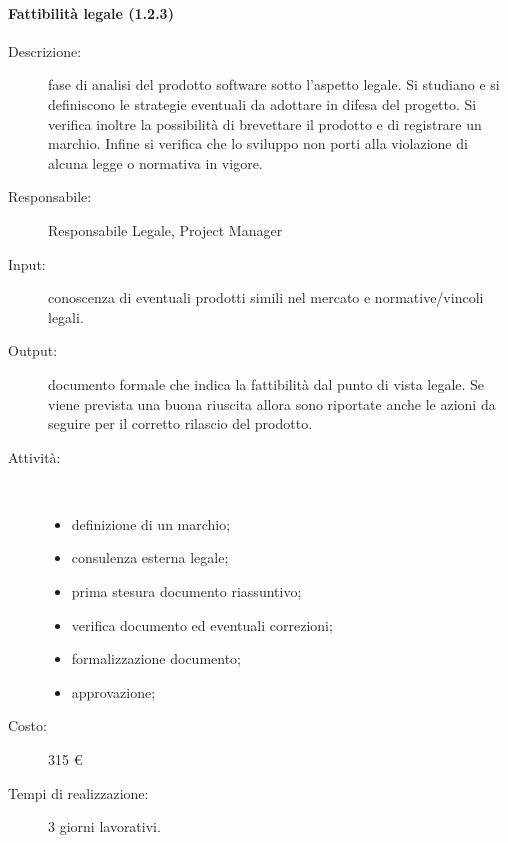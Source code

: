 \paragraph{Fattibilit\`{a} legale (1.2.3)}
\begin{description}
\item[Descrizione:] fase di analisi del prodotto software sotto l'aspetto legale. Si studiano e si definiscono le strategie eventuali da adottare in difesa del progetto. Si verifica inoltre la possibilit\`{a} di brevettare il prodotto e di registrare un marchio. Infine si verifica che lo sviluppo non porti alla violazione di alcuna legge o normativa in vigore.
\item[Responsabile:] Responsabile Legale, Project Manager
\item[Input:] conoscenza di eventuali prodotti simili nel mercato e normative/vincoli legali.
\item[Output:] documento formale che indica la fattibilità dal punto di vista legale. Se viene prevista una buona riuscita allora sono riportate anche le azioni da seguire per il corretto rilascio del prodotto.
\item[Attività:]\mbox{}\\[-1.5\baselineskip]
	\begin{itemize}
	\item definizione di un marchio;
	\item consulenza esterna legale;
	\item prima stesura documento riassuntivo;
	\item verifica documento ed eventuali correzioni;
	\item formalizzazione documento;
	\item approvazione;
	\end{itemize}
\item[Costo:] 315 \euro{}
\item[Tempi di realizzazione:] 3 giorni lavorativi.
\end{description}

